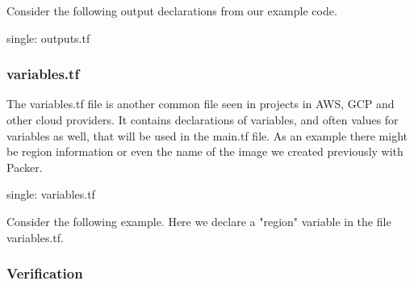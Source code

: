 Consider the following output declarations from our example code.

\begin{Shaded}
\begin{Highlighting}[]
 \NormalTok{ \{}
   \NormalTok{ = }
\NormalTok{\}}

 \NormalTok{ \{}
   \NormalTok{ = }
\NormalTok{\}}
\end{Highlighting}
\end{Shaded}

single: outputs.tf

\hypertarget{variables.tf}{%
\subsubsection{variables.tf}\label{variables.tf}}

The variables.tf file is another common file seen in projects in AWS,
GCP and other cloud providers. It contains declarations of variables,
and often values for variables as well, that will be used in the main.tf
file. As an example there might be region information or even the name
of the image we created previously with Packer.

single: variables.tf

Consider the following example. Here we declare a "region" variable in
the file variables.tf.

\begin{Shaded}
\begin{Highlighting}[]
 \NormalTok{ \{}
   \NormalTok{ = }
   \NormalTok{     = }
\NormalTok{\}}
\end{Highlighting}
\end{Shaded}

\hypertarget{verification}{%
\subsubsection{Verification}\label{verification}}

